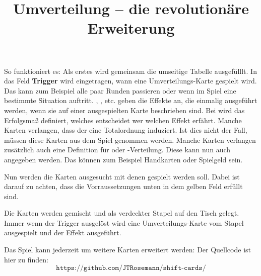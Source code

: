 \documentclass[a4paper]{article}
\title{Umverteilung -- die revolutionäre Erweiterung}
\date{}
\begin{document}
\maketitle
\large
So funktioniert es:
Als erstes wird gemeinsam die umseitige Tabelle ausgefülllt.
In das Feld \textbf{Trigger} wird eingetragen, wann eine Umverteilungs-Karte gespielt wird.
Das kann zum Beispiel alle paar Runden passieren oder wenn im Spiel eine bestimmte Situation auftritt.
\bonusA{}, \malusA{}, etc. geben die Effekte an, die einmalig ausgeführt werden, wenn sie auf einer ausgespielten Karte beschrieben sind.
Bei \status{} wird das Erfolgsmaß definiert, welches entscheidet wer welchen Effekt erfährt.
Manche Karten verlangen, dass der \status{} eine Totalordnung induziert.
Ist dies nicht der Fall, müssen diese Karten aus dem Spiel genommen werden.
Manche Karten verlangen zusätzlich auch eine Definition für \kapital{} oder \kapital{}-Verteilung.
Diese kann nun auch angegeben werden.
Das können zum Beispiel Handkarten oder Spielgeld sein.

Nun werden die Karten ausgesucht mit denen gespielt werden soll.
Dabei ist darauf zu achten, dass die Vorraussetzungen unten in dem gelben Feld erfüllt sind.

Die Karten werden gemischt und als verdeckter Stapel auf den Tisch gelegt.
Immer wenn der Trigger ausgelöst wird eine Umverteilungs-Karte vom Stapel ausgespielt und der Effekt ausgeführt.

Das Spiel kann jederzeit um weitere Karten erweitert werden:
Der Quellcode ist hier zu finden:
\[\texttt{https://github.com/JTRosemann/shift-cards/}\]
\end{document}
